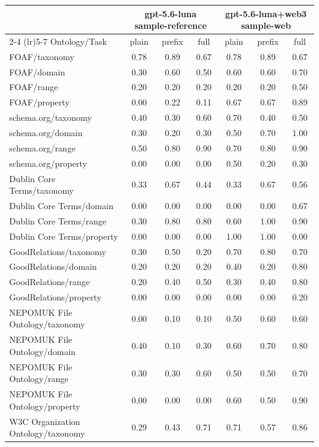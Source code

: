 \begin{tabular}{lcccccc}
\toprule
 & \multicolumn{3}{c}{gpt-5.6-luna sample-reference} & \multicolumn{3}{c}{gpt-5.6-luna+web3 sample-web} \\
\cmidrule(lr){2-4} \cmidrule(lr){5-7}
Ontology/Task & plain & prefix & full & plain & prefix & full \\
\midrule
FOAF/taxonomy & 0.78 & 0.89 & 0.67 & 0.78 & 0.89 & 0.67 \\
FOAF/domain & 0.30 & 0.60 & 0.50 & 0.60 & 0.60 & 0.70 \\
FOAF/range & 0.20 & 0.20 & 0.20 & 0.20 & 0.20 & 0.50 \\
FOAF/property & 0.00 & 0.22 & 0.11 & 0.67 & 0.67 & 0.89 \\
schema.org/taxonomy & 0.40 & 0.30 & 0.60 & 0.70 & 0.40 & 0.50 \\
schema.org/domain & 0.30 & 0.20 & 0.30 & 0.50 & 0.70 & 1.00 \\
schema.org/range & 0.50 & 0.80 & 0.90 & 0.70 & 0.80 & 0.90 \\
schema.org/property & 0.00 & 0.00 & 0.00 & 0.50 & 0.20 & 0.30 \\
Dublin Core Terms/taxonomy & 0.33 & 0.67 & 0.44 & 0.33 & 0.67 & 0.56 \\
Dublin Core Terms/domain & 0.00 & 0.00 & 0.00 & 0.00 & 0.00 & 0.67 \\
Dublin Core Terms/range & 0.30 & 0.80 & 0.80 & 0.60 & 1.00 & 0.90 \\
Dublin Core Terms/property & 0.00 & 0.00 & 0.00 & 1.00 & 1.00 & 0.00 \\
GoodRelations/taxonomy & 0.30 & 0.50 & 0.20 & 0.70 & 0.80 & 0.70 \\
GoodRelations/domain & 0.20 & 0.20 & 0.20 & 0.40 & 0.20 & 0.80 \\
GoodRelations/range & 0.20 & 0.40 & 0.50 & 0.30 & 0.40 & 0.80 \\
GoodRelations/property & 0.00 & 0.00 & 0.00 & 0.00 & 0.00 & 0.20 \\
NEPOMUK File Ontology/taxonomy & 0.00 & 0.10 & 0.10 & 0.50 & 0.60 & 0.60 \\
NEPOMUK File Ontology/domain & 0.40 & 0.10 & 0.30 & 0.60 & 0.70 & 0.80 \\
NEPOMUK File Ontology/range & 0.30 & 0.30 & 0.60 & 0.50 & 0.50 & 0.70 \\
NEPOMUK File Ontology/property & 0.00 & 0.00 & 0.00 & 0.60 & 0.50 & 0.90 \\
W3C Organization Ontology/taxonomy & 0.29 & 0.43 & 0.71 & 0.71 & 0.57 & 0.86 \\

\end{tabular}
